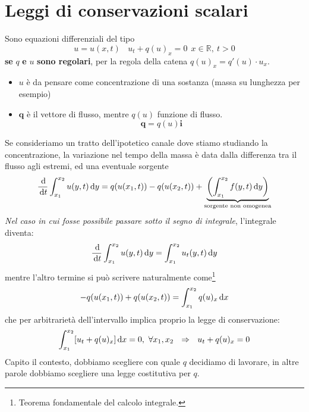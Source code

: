 \chapter{Leggi di conservazioni scalari}

Sono equazioni differenziali del tipo
\begin{equation}
    u=u(x,t) \ \ \ \ \boxed{u_{t} +q(u)_{x} =0}\ \ x\in \mathbb{R} ,\ t >0
\end{equation}
\textbf{se }$q$\textbf{ e }$u$\textbf{ sono regolari}, per la regola della catena $q(u)_{x} =q'(u) \cdotp u_{x}$.
\begin{itemize}
    \item $u$ è da pensare come concentrazione di una sostanza (massa su lunghezza per esempio)
    \item $\mathbf{q}$ è il vettore di flusso, mentre $q(u)$ funzione di flusso.
          \begin{equation}
              \mathbf{q} =q(u)\mathbf{i}
          \end{equation}
\end{itemize}

Se consideriamo un tratto dell'ipotetico canale dove stiamo studiando la concentrazione, la variazione nel tempo della massa è data dalla differenza tra il flusso agli estremi, ed una eventuale sorgente
\begin{equation*}
    \frac{\,\mathrm d}{\,\mathrm d t}\int ^{x_{2}}_{x_{1}} u(y,t) \,\mathrm d y=q(u(x_{1} ,t)) -q(u(x_{2} ,t)) +\underbrace{\left(\int ^{x_{2}}_{x_{1}} f(y,t) \,\mathrm d y\right)}_{\text{sorgente non omogenea}}
\end{equation*}
\emph{Nel caso in cui fosse possibile passare sotto il segno di integrale}, l'integrale diventa:
\begin{equation}
    \frac{\,\mathrm d}{\,\mathrm d t}\int ^{x_{2}}_{x_{1}} u(y,t) \,\mathrm d y=\int ^{x_{2}}_{x_{1}} u_{t}(y,t) \,\mathrm d y
    \label{eq:lc-passaggio-derivata-integrale}
\end{equation}
mentre l'altro termine si può scrivere naturalmente come\footnote{Teorema fondamentale del calcolo integrale.}
\begin{equation*}
    -q(u(x_{1} ,t)) +q(u(x_{2} ,t)) =\int ^{x_{2}}_{x_{1}} q(u)_{x} \,\mathrm d x
\end{equation*}
che per arbitrarietà dell'intervallo implica proprio la legge di conservazione:
\begin{equation*}
    \int ^{x_{2}}_{x_{1}}[ u_{t} +q(u)_{x}] \dx=0,\ \forall x_{1} ,x_{2} \ \ \Rightarrow \ \ u_{t} +q(u)_{x} =0
\end{equation*}
Capito il contesto, dobbiamo scegliere con quale $q$ decidiamo di lavorare, in altre parole dobbiamo scegliere una legge costitutiva per $q$.

